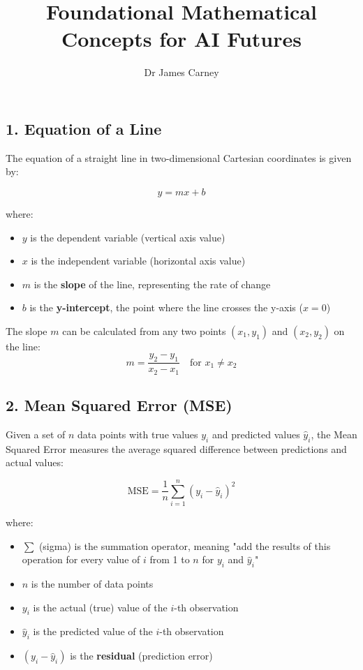 \documentclass{article}
\title{Foundational Mathematical Concepts for AI Futures}
\author{Dr James Carney}
\date{}
\begin{document}
\maketitle


\vspace{1cm}

\section*{}



\subsection*{1. Equation of a Line}
The equation of a straight line in two-dimensional Cartesian coordinates is given by:

\[
y = mx + b
\]

where:
\begin{itemize}
    \item $y$ is the dependent variable (vertical axis value)
    \item $x$ is the independent variable (horizontal axis value)
    \item $m$ is the \textbf{slope} of the line, representing the rate of change
    \item $b$ is the \textbf{y-intercept}, the point where the line crosses the y-axis ($x = 0$)
\end{itemize}

The slope $m$ can be calculated from any two points $(x_1, y_1)$ and $(x_2, y_2)$ on the line:
\[
m = \frac{y_2 - y_1}{x_2 - x_1} \quad \text{for } x_1 \neq x_2
\]

\subsection*{2. Mean Squared Error (MSE)}
Given a set of $n$ data points with true values $y_i$ and predicted values $\hat{y}_i$, the Mean Squared Error measures the average squared difference between predictions and actual values:

\[
\text{MSE} = \frac{1}{n} \sum_{i=1}^{n} (y_i - \hat{y}_i)^2
\]

where:
\begin{itemize}
    \item $\sum$ (sigma) is the summation operator, meaning "add the results of this operation for every value of $i$ from 1 to $n$ for $y_i$ and $\hat{y}_i$"
    \item $n$ is the number of data points
    \item $y_i$ is the actual (true) value of the $i$-th observation
    \item $\hat{y}_i$ is the predicted value of the $i$-th observation
    \item $(y_i - \hat{y}_i)$ is the \textbf{residual} (prediction error)
\end{itemize}
\end{document}
